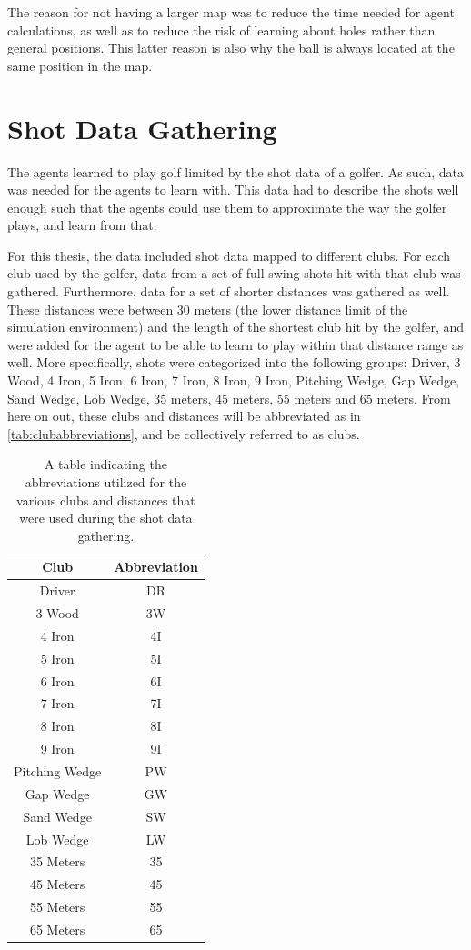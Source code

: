 \documentclass{kththesis}
\begin{document}
The reason for not having a larger map was to reduce the time needed for agent calculations, as well as to reduce the risk of learning about holes rather than general positions. This latter reason is also why the ball is always located at the same position in the map.

\section{Shot Data Gathering}
\label{sec:datagathering}
The agents learned to play golf limited by the shot data of a golfer. As such, data was needed for the agents to learn with. This data had to describe the shots well enough such that the agents could use them to approximate the way the golfer plays, and learn from that.

For this thesis, the data included shot data mapped to different clubs. For each club used by the golfer, data from a set of full swing shots hit with that club was gathered. Furthermore, data for a set of shorter distances was gathered as well. These distances were between 30 meters (the lower distance limit of the simulation environment) and the length of the shortest club hit by the golfer, and were added for the agent to be able to learn to play within that distance range as well. More specifically, shots were categorized into the following groups: Driver, 3 Wood, 4 Iron, 5 Iron, 6 Iron, 7 Iron, 8 Iron, 9 Iron, Pitching Wedge, Gap Wedge, Sand Wedge, Lob Wedge, 35 meters, 45 meters, 55 meters and 65 meters. From here on out, these clubs and distances will be abbreviated as in \autoref{tab:clubabbreviations}, and be collectively referred to as clubs.

\begin{table}
    \centering
    \begin{tabular}{c|c}
        \textbf{Club} & \textbf{Abbreviation} \\ \hline
        Driver & DR \\ 
        3 Wood & 3W \\  
        4 Iron & 4I \\  
        5 Iron & 5I \\  
        6 Iron & 6I \\  
        7 Iron & 7I \\  
        8 Iron & 8I \\  
        9 Iron & 9I \\  
        Pitching Wedge & PW \\  
        Gap Wedge & GW \\  
        Sand Wedge & SW \\  
        Lob Wedge & LW \\  
        35 Meters & 35 \\  
        45 Meters & 45 \\  
        55 Meters & 55 \\  
        65 Meters & 65 \\  
    \end{tabular}
    \caption{A table indicating the abbreviations utilized for the various clubs and distances that were used during the shot data gathering.}
    \label{tab:clubabbreviations}
\end{table}
\end{document}
